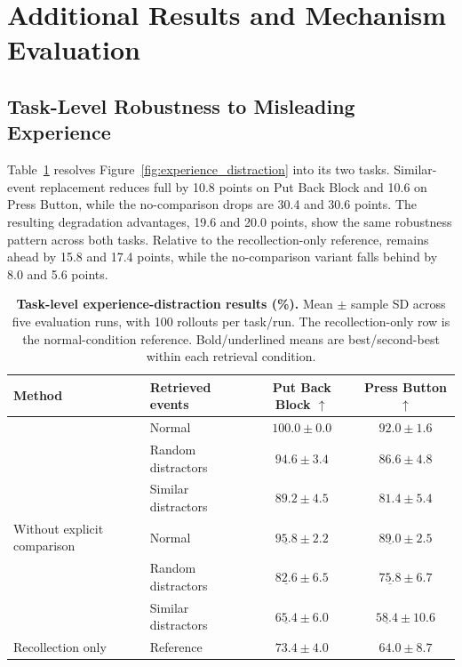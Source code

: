 \section{Additional Results and Mechanism Evaluation}
\label{app:additional_results}

\subsection{Task-Level Robustness to Misleading Experience}
\label{app:fullresults}

Table~\ref{tab:app_distraction_tasks} resolves Figure~\ref{fig:experience_distraction} into its two tasks.
Similar-event replacement reduces full \method{} by 10.8 points on Put Back Block and 10.6 on Press Button, while the no-comparison drops are 30.4 and 30.6 points.
The resulting degradation advantages, 19.6 and 20.0 points, show the same robustness pattern across both tasks.
Relative to the recollection-only reference, \method{} remains ahead by 15.8 and 17.4 points, while the no-comparison variant falls behind by 8.0 and 5.6 points.

\begin{table}[H]
\centering\small
\caption{\textbf{Task-level experience-distraction results (\%).} Mean $\pm$ sample SD across five evaluation runs, with 100 rollouts per task/run. The recollection-only row is the normal-condition reference. Bold/underlined means are best/second-best within each retrieval condition.}
\label{tab:app_distraction_tasks}
\begin{tabular}{@{}llcc@{}}
\toprule
Method & Retrieved events & Put Back Block $\uparrow$ & Press Button $\uparrow$ \\
\midrule
\method{} & Normal & $\mathbf{100.0}\pm0.0$ & $\mathbf{92.0}\pm1.6$ \\
 & Random distractors & $\mathbf{94.6}\pm3.4$ & $\mathbf{86.6}\pm4.8$ \\
 & Similar distractors & $\mathbf{89.2}\pm4.5$ & $\mathbf{81.4}\pm5.4$ \\
\midrule
Without explicit comparison & Normal & $\underline{95.8}\pm2.2$ & $\underline{89.0}\pm2.5$ \\
 & Random distractors & $\underline{82.6}\pm6.5$ & $\underline{75.8}\pm6.7$ \\
 & Similar distractors & $\underline{65.4}\pm6.0$ & $\underline{58.4}\pm10.6$ \\
\midrule
Recollection only & Reference & $73.4\pm4.0$ & $64.0\pm8.7$ \\
\bottomrule
\end{tabular}
\end{table}

